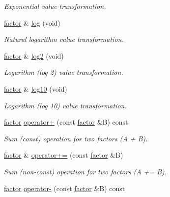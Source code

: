 \begin{DoxyCompactItemize}
\begin{DoxyCompactList}\small\item\em Exponential value transformation. \end{DoxyCompactList}\item 
\hyperlink{classmerlin_1_1factor}{factor} \& \hyperlink{classmerlin_1_1factor_afd7a5ee7905506348fa881f778fb80b1}{log} (void)
\begin{DoxyCompactList}\small\item\em Natural logarithm value transformation. \end{DoxyCompactList}\item 
\hyperlink{classmerlin_1_1factor}{factor} \& \hyperlink{classmerlin_1_1factor_a307828f6df2cd2ba6d61a32c81411144}{log2} (void)
\begin{DoxyCompactList}\small\item\em Logarithm (log 2) value transformation. \end{DoxyCompactList}\item 
\hyperlink{classmerlin_1_1factor}{factor} \& \hyperlink{classmerlin_1_1factor_aaee650c64f9cb953d78dc45a2bfeb8d2}{log10} (void)
\begin{DoxyCompactList}\small\item\em Logarithm (log 10) value transformation. \end{DoxyCompactList}\item 
\hyperlink{classmerlin_1_1factor}{factor} \hyperlink{classmerlin_1_1factor_ad6dc4c3117cc69848d5a1170e223b017}{operator+} (const \hyperlink{classmerlin_1_1factor}{factor} \&B) const \hypertarget{classmerlin_1_1factor_ad6dc4c3117cc69848d5a1170e223b017}{}\label{classmerlin_1_1factor_ad6dc4c3117cc69848d5a1170e223b017}

\begin{DoxyCompactList}\small\item\em Sum (const) operation for two factors (A + B). \end{DoxyCompactList}\item 
\hyperlink{classmerlin_1_1factor}{factor} \& \hyperlink{classmerlin_1_1factor_afecdd63d805c8cd56b2ccb189650ddee}{operator+=} (const \hyperlink{classmerlin_1_1factor}{factor} \&B)\hypertarget{classmerlin_1_1factor_afecdd63d805c8cd56b2ccb189650ddee}{}\label{classmerlin_1_1factor_afecdd63d805c8cd56b2ccb189650ddee}

\begin{DoxyCompactList}\small\item\em Sum (non-\/const) operation for two factors (A += B). \end{DoxyCompactList}\item 
\hyperlink{classmerlin_1_1factor}{factor} \hyperlink{classmerlin_1_1factor_a35a30052a2a474fa9d54061e2135d121}{operator-\/} (const \hyperlink{classmerlin_1_1factor}{factor} \&B) const \hypertarget{classmerlin_1_1factor_a35a30052a2a474fa9d54061e2135d121}{}\label{classmerlin_1_1factor_a35a30052a2a474fa9d54061e2135d121}


\end{DoxyCompactItemize}
